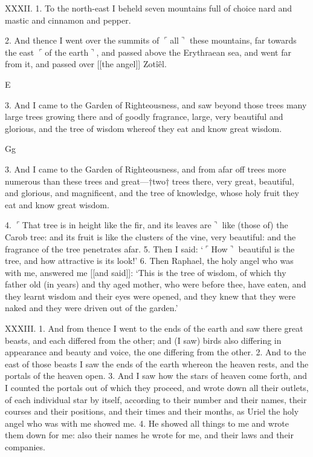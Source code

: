 XXXII. 1. To the
north-east I beheld seven
mountains full of choice
nard and mastic and
cinnamon and pepper.

2. And thence I went over the summits of $\ulcorner$all$\urcorner$
these mountains, far towards the east $\ulcorner$of the earth$\urcorner$,
and passed above the Erythraean sea, and went far
from it, and passed over [[the angel]] Zotîêl.

E

3. And I came to the
Garden of Righteousness,
and saw beyond those
trees many large trees
growing there and of
goodly fragrance, large,
very beautiful and glorious,
and the tree of wisdom
whereof they eat
and know great wisdom.

Gg

3. And I came to the
Garden of Righteousness,
and from afar off trees
more numerous than
these trees and great—†two†
trees there, very
great, beautiful, and
glorious, and magnificent,
and the tree of knowledge,
whose holy fruit
they eat and know great
wisdom.

4. $\ulcorner$That tree is in height like the fir, and its leaves
are$\urcorner$ like (those of) the Carob tree: and its fruit is
like the clusters of the vine, very beautiful: and the
fragrance of the tree penetrates afar. 5. Then I
said: ‘$\ulcorner$How$\urcorner$ beautiful is the tree, and how attractive
is its look!’ 6. Then Raphael, the holy angel
who was with me, answered me [[and said]]: ‘This
is the tree of wisdom, of which thy father old (in
years) and thy aged mother, who were before thee,
have eaten, and they learnt wisdom and their eyes
were opened, and they knew that they were naked
and they were driven out of the garden.’

XXXIII. 1. And from thence I went to the ends
of the earth and saw there great beasts, and each
differed from the other; and (I saw) birds also differing
in appearance and beauty and voice, the one
differing from the other. 2. And to the east of those
beasts I saw the ends of the earth whereon the heaven
rests, and the portals of the heaven open. 3. And
I saw how the stars of heaven come forth, and I
counted the portals out of which they proceed, and
wrote down all their outlets, of each individual star
by itself, according to their number and their names,
their courses and their positions, and their times
and their months, as Uriel the holy angel who was
with me showed me. 4. He showed all things to me
and wrote them down for me: also their names he
wrote for me, and their laws and their companies.

